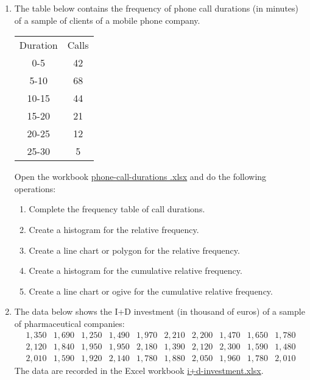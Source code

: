 \begin{enumerate}[leftmargin=*,resume]
\item\label{phone-call-duration} The table below contains the frequency of phone call durations (in minutes) of a sample
of clients of a mobile phone company.
\begin{center}
\begin{tabular}{cc}
\toprule
Duration & Calls\\
0-5 & 42\\
5-10 & 68\\
10-15 & 44\\
15-20 & 21\\
20-25 & 12\\
25-30 & 5\\
\bottomrule
\end{tabular}
\end{center}
Open the workbook
\href{http://aprendeconalf.es/office/excel/exercises/descriptive-statistics/phone-call-durations.xlsx}{\textsf{phone-call-durations
.xlsx}}
and do the following operations:
\begin{enumerate}
\item Complete the frequency table of call durations. 
\item Create a histogram for the relative frequency.
\item Create a line chart or polygon for the relative frequency. 
\item Create a histogram for the cumulative relative frequency. 
\item Create a line chart or ogive for the cumulative relative frequency. 
\end{enumerate}


\item\label{i+d-investment} The data below shows the I+D investment (in thousand of euros) of a sample of pharmaceutical companies:
\[
\begin{array}{rrrrrrrrrr}
1,350 & 1,690 & 1,250 & 1,490 & 1,970 & 2,210 & 2,200 & 1,470 & 1,650 & 1,780 \\
2,120 & 1,840 & 1,950 & 1,950 & 2,180 & 1,390 & 2,120 & 2,300 & 1,590 & 1,480 \\
2,010 & 1,590 & 1,920 & 2,140 & 1,780 & 1,880 & 2,050 & 1,960 & 1,780 & 2,010 
\end{array}
\]
The data are recorded in the Excel workbook \href{http://aprendeconalf.es/office/excel/exercises/descriptive-statistics/i+d-investment.xlsx}{\textsf{i+d-investment.xlsx}}.


\end{enumerate}
